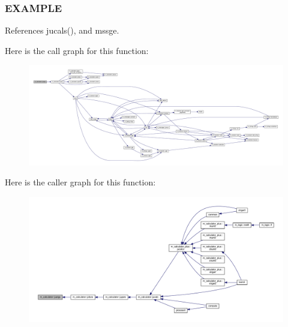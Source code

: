 \subsubsection*{E\+X\+A\+M\+P\+LE}

References jucals(), and mssge.

Here is the call graph for this function\+:
\nopagebreak
\begin{figure}[H]
\begin{center}
\leavevmode
\includegraphics[width=350pt]{namespacem__calculator_a6fc04e994f45d649d5e412e0013bf127_cgraph}
\end{center}
\end{figure}
Here is the caller graph for this function\+:
\nopagebreak
\begin{figure}[H]
\begin{center}
\leavevmode
\includegraphics[width=350pt]{namespacem__calculator_a6fc04e994f45d649d5e412e0013bf127_icgraph}
\end{center}
\end{figure}
\mbox{\label{namespacem__calculator_a99dafdeb0fe1a589face7a3eaf5c66bd}} 

